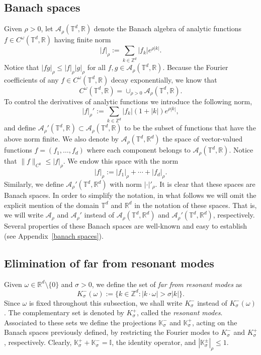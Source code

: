 \documentclass[12pt,reqno,a4paper]{amsart}%
\numberwithin{equation}{section}
\newcommand{\A}{{\mathcal A}}
\newcommand{\Ii}{{\mathbb{I}}}
\newcommand{\Kk}{{\mathbb{K}}}
\newcommand{\Rr}{{\mathbb{R}}}
\newcommand{\Tt}{{\mathbb{T}}}
\newcommand{\Zz}{{\mathbb{Z}}}
\begin{document}
\subsection{Banach spaces}

Given $\rho>0$, let $\A_{\rho}(\Tt^d,\Rr)$ denote the Banach algebra of analytic functions $f\in C^\omega(\Tt^d,\Rr)$ having finite norm
$$
|f|_{\rho}:=\sum_{k\in\Zz^d}|f_k|e^{\rho|k|}.
$$ 
Notice that $|fg|_\rho\leq |f|_\rho|g|_\rho$ for all $f,g\in \A_{\rho}(\Tt^d,\Rr)$.
Because the Fourier coefficients of any $f\in C^\omega(\Tt^d,\Rr)$ decay exponentially, we know that 
$$
C^{\omega}(\Tt^d,\Rr)=\cup_{\rho>0}\A_{\rho}(\Tt^d,\Rr).
$$
To control the derivatives of analytic functions we introduce the following norm,
$$
|f|_{\rho}':=\sum_{k\in\Zz^d}|f_k|(1+|k|)e^{\rho|k|},
$$ 
and define $\A_{\rho}'(\Tt^d,\Rr)\subset\A_{\rho}(\Tt^d,\Rr)$ to be the subset of functions that have the above norm finite. 
We also denote by $\A_{\rho}(\Tt^d,\Rr^d)$ the space of vector-valued functions $f=(f_1,\ldots,f_d)$ where each component belongs to $\A_{\rho}(\Tt^d,\Rr)$.  Notice that $\|f\|_{C^0}\leq |f|_\rho$.  We endow this space with the norm
$$
|f|_{\rho}:=|f_1|_{\rho}+\cdots+|f_d|_{\rho}.
$$
Similarly, we define $\A_{\rho}'(\Tt^d,\Rr^d)$ with norm $|\cdot|'_{\rho}$. It is clear that these spaces are Banach spaces. 
In order to simplify the notation, in what follows we will omit the explicit mention of the domain $\Tt^d$ and $\Rr^d$ in the notation of these spaces. That is, we will write $\A_{\rho}$ and $\A_{\rho}'$ instead of $\A_{\rho}(\Tt^d,\Rr^d)$ and $\A_{\rho}'(\Tt^d,\Rr^d)$, respectively. 
Several properties of these Banach spaces are well-known and easy to establish (see Appendix~\ref{banach spaces}). 



\subsection{Elimination of far from resonant modes}


Given $\omega\in\Rr^d\setminus\{0\}$ and $\sigma>0$, we define the set of \textit{far from resonant modes} as
$$
K_\sigma^-(\omega) := \{k\in\Zz^d\colon |k\cdot \omega|>\sigma|k|\}.
$$
Since $\omega$ is fixed throughout this subsection, we shall write $K_\sigma^-$ instead of $K_\sigma^-(\omega)$. The complementary set is denoted by $K_\sigma^+$, called the \textit{resonant modes}. Associated to these sets we define the projections $\Kk^-_\sigma$ and $\Kk^+_\sigma$, acting on the Banach spaces previously defined, by restricting the Fourier modes to $K_\sigma^-$ and $K_\sigma^+$, respectively.  Clearly,  $\Kk_\sigma^++\Kk_\sigma^-=\Ii$,  the identity operator,  and $|\Kk_\sigma^\pm|_{\rho}\leq 1$.
\end{document}
